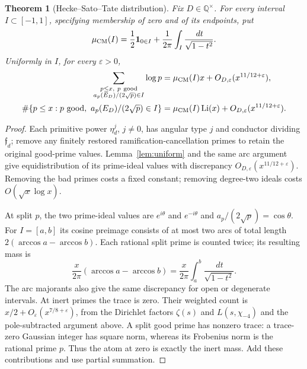 \documentclass[11pt,a4paper]{article}
\numberwithin{equation}{section}
\newtheorem{theorem}{Theorem}[section]
\theoremstyle{definition}
\theoremstyle{remark}
\newcommand{\Q}{\mathbb Q}
\newcommand{\ind}{\mathbf1}
\newcommand{\dd}{\,d}
\newcommand{\eps}{\varepsilon}
\DeclareMathOperator{\Li}{Li}
\begin{document}
\begin{theorem}[Hecke--Sato--Tate distribution]\label{thm:ST}
Fix $D\in\Q^\times$. For every interval $I\subset[-1,1]$, specifying membership of zero and of its endpoints, put
\[
 \mu_{\rm CM}(I)=\frac12\ind_{0\in I}
                 +\frac1{2\pi}\int_I\frac{\dd t}{\sqrt{1-t^2}}.
\]
Uniformly in $I$, for every $\eps>0$,
\begin{align}\label{eq:ST}
 \sum_{\substack{p\le x,\ p\ {\rm good}\\
                  a_p(E_D)/(2\sqrt p)\in I}}\log p
 &=\mu_{\rm CM}(I)x+O_{D,\eps}(x^{11/12+\eps}),\notag\\
 \#\{p\le x:p\ {\rm good},\ a_p(E_D)/(2\sqrt p)\in I\}
 &=\mu_{\rm CM}(I)\Li(x)+O_{D,\eps}(x^{11/12+\eps}).
\end{align}
\end{theorem}
\begin{proof}
Each primitive power $\eta_d^j$, $j\ne0$, has angular type $j$ and conductor dividing $\mathfrak f_d$; remove any finitely restored ramification-cancellation primes to retain the original good-prime values. Lemma~\ref{lem:uniform} and the same arc argument give equidistribution of its prime-ideal values with discrepancy $O_{D,\eps}(x^{11/12+\eps})$. Removing the bad primes costs a fixed constant; removing degree-two ideals costs $O(\sqrt x\log x)$.

At split $p$, the two prime-ideal values are $e^{i\theta}$ and $e^{-i\theta}$ and $a_p/(2\sqrt p)=\cos\theta$. For $I=[a,b]$ its cosine preimage consists of at most two arcs of total length $2(\arccos a-\arccos b)$. Each rational split prime is counted twice; its resulting mass is
\[
 \frac{x}{2\pi}(\arccos a-\arccos b)
        =\frac{x}{2\pi}\int_a^b\frac{\dd t}{\sqrt{1-t^2}}.
\]
The arc majorants also give the same discrepancy for open or degenerate intervals. At inert primes the trace is zero. Their weighted count is
$x/2+O_\eps(x^{7/8+\eps})$, from the Dirichlet factors $\zeta(s)$ and $L(s,\chi_{-4})$ and the pole-subtracted argument above. A split good prime has nonzero trace: a trace-zero Gaussian integer has square norm, whereas its Frobenius norm is the rational prime $p$. Thus the atom at zero is exactly the inert mass. Add these contributions and use partial summation.
\end{proof}
\end{document}

